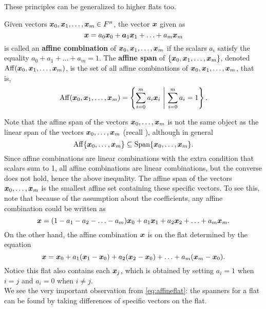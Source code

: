 These principles can be generalized to higher flats too.\\

\begin{Def} Given vectors $\boldsymbol x_0, \boldsymbol x_1, \ldots, \boldsymbol x_m \in F^n$, the vector $\boldsymbol x$ given as \[\boldsymbol x = a_0\boldsymbol x_0 + \boldsymbol a_1\boldsymbol x_1 +\ldots + a_m\boldsymbol x_m\] is called an  \textbf{affine combination} of $\boldsymbol x_0, \boldsymbol x_1, \ldots, \boldsymbol x_m$ if the scalars $a_i$ satisfy the equality $a_0+a_1+\ldots + a_m=1$. The \textbf{affine span} of $\{\boldsymbol x_0, \boldsymbol x_1, \ldots, \boldsymbol x_m\}$, denoted $\operatorname*{Aff}(\boldsymbol x_0, \boldsymbol x_1, \ldots, \boldsymbol x_m)$, is the set of all affine combinations of $\boldsymbol x_0, \boldsymbol x_1, \ldots, \boldsymbol x_m$, that is, 
\[\operatorname*{Aff}(\boldsymbol x_0, \boldsymbol x_1, \ldots, \boldsymbol x_m) = \left\{\sum_{i=0}^m a_i\boldsymbol x_i\ \middle|\ \sum_{i=0}^m a_i=1\right\}.\]
\end{Def}\vs

Note that the affine span of the vectors $\boldsymbol x_0,\ldots, \boldsymbol x_m$ is not the same object as the linear span of the vectors $\boldsymbol x_0,\ldots, \boldsymbol x_m$ (recall ), although in general
\begin{equation} \operatorname*{Aff}\{\boldsymbol x_0,\ldots, \boldsymbol x_m\} \subseteq \operatorname{Span}\{\boldsymbol x_0,\ldots, \boldsymbol x_m \}.\end{equation} Since affine combinations are linear combinations with the extra condition that scalars sum to 1, all affine combinations are linear combinations, but the converse does not hold, hence the above inequality. The affine span of the vectors $\boldsymbol x_0,\ldots, \boldsymbol x_m$ is the smallest affine set containing these specific vectors. To see this, note that because of the assumption about the coefficients, any affine combination could be written as \[\boldsymbol x = (1-a_1-a_2-\ldots - a_m)\boldsymbol x_0 + a_1\boldsymbol x_1+a_2\boldsymbol x_2+\ldots + a_m\boldsymbol x_m.\] On the other hand, the affine combination $\boldsymbol x$ is on the flat determined by the equation
\begin{equation}\label{eq:affineflat}\boldsymbol x = \boldsymbol x_0 + a_1(\boldsymbol x_1-\boldsymbol x_0) + a_2(\boldsymbol x_2-\boldsymbol x_0) +\ldots + a_m(\boldsymbol x_m-\boldsymbol x_0) .\end{equation} Notice this flat also contains each $\boldsymbol x_j$, which is obtained by setting $a_i=1$ when $i=j$ and $a_i=0$ when $i\neq j$. \\

We see the very important observation from \eqref{eq:affineflat}: the spanners for a flat can be found by taking differences of specific vectors on the flat.\\

